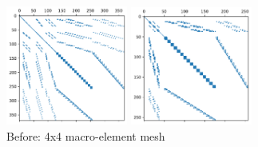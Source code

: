 \begin{center}
\includegraphics[width=4cm]{python_codes/fieldstone_78/results/spy/A_bef_topo6.pdf}
\includegraphics[width=4cm]{python_codes/fieldstone_78/results/spy/A_bef_topo7.pdf}\\
{\captionfont Before: 4x4 macro-element mesh}
\end{center}

